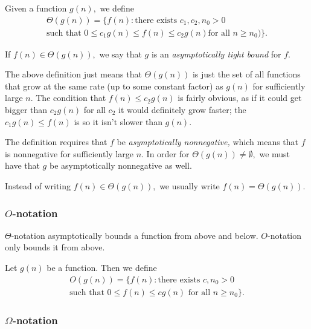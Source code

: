 \documentclass{article}
\begin{document}
\begin{tcolorbox}[title=$\Theta$-notation]
	Given a function $g(n),$ we define
	\begin{multline*}
		\Theta(g(n)) = \{ f(n) : \text{there exists } c_1, c_2, n_0 > 0 \\ \text{such that }0 \leq c_1g(n) \leq f(n) \leq c_2g(n) \text{for all } n \geq n_0) \}.
	\end{multline*}

	If $f(n) \in \Theta(g(n)),$ we say that $g$ is an \textit{asymptotically tight bound} for $f.$
\end{tcolorbox}

\vspace{2mm}

The above definition just means that $\Theta(g(n))$ is just the set of all functions that grow at the same rate (up to some constant factor) as $g(n)$ for sufficiently large $n.$ The condition that $f(n) \leq c_2g(n)$ is fairly obvious, as if it could get bigger than $c_2g(n)$ for all $c_2$ it would definitely grow faster; the $c_1g(n) \leq f(n)$ is so it isn't slower than $g(n).$

The definition requires that $f$ be \textit{asymptotically nonnegative,} which means that $f$ is nonnegative for sufficiently large $n.$ In order for $\Theta(g(n)) \neq \emptyset,$ we must have that $g$ be asymptotically nonnegative as well. 

Instead of writing $f(n) \in \Theta(g(n)),$ we usually write $f(n) = \Theta(g(n)).$ 

\subsubsection{$O$-notation}

$\Theta$-notation asymptotically bounds a function from above and below. $O$-notation only bounds it from above. 

\begin{tcolorbox}[title=$O$-notation]
	Let $g(n)$ be a function. Then we define
	\begin{multline*}
	O(g(n)) = \{ f(n) : \text{there exists } c, n_0 > 0 \\ \text{such that } 0 \leq f(n) \leq cg(n) \text{ for all } n \geq n_0 \}.
	\end{multline*}
\end{tcolorbox}

\subsubsection{$\Omega$-notation}
\end{document}
